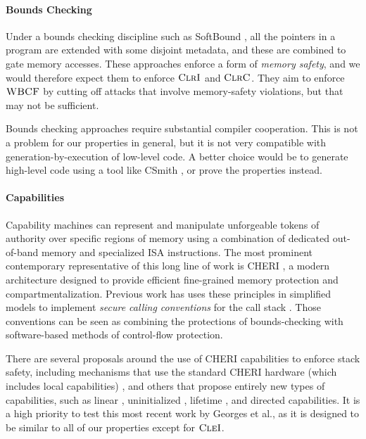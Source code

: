 \documentclass[10pt,conference]{ieeetran}%
\theoremstyle{definition}
\begin{document}
\paragraph{Bounds Checking}
%
Under a bounds checking discipline such as SoftBound \cite{NagarakatteZMZ09}, all the pointers
in a program are extended with some disjoint metadata, and these are combined
to gate memory accesses. These approaches enforce a form of \emph{memory safety},
and we would therefore expect them to enforce \(\textnormal{\sc ClrI}\) and \(\textnormal{\sc ClrC}\). They aim
to enforce \(\textnormal{\sc WBCF}\) by cutting off attacks that involve memory-safety violations,
but that may not be sufficient.

Bounds checking approaches require substantial compiler cooperation. This is not a
problem for our properties in general, but it is not very compatible with
generation-by-execution of low-level code. A better choice would be to generate
high-level code using a tool like CSmith \cite{DBLP:conf/pldi/YangCER11}, or prove the properties instead.

\paragraph{Capabilities}

Capability machines can represent and manipulate
unforgeable tokens of authority over specific regions of
memory using a combination of dedicated out-of-band memory and
specialized ISA instructions.
%
The most prominent contemporary representative of this long line of work is
CHERI \cite{DBLP:conf/sp/WatsonWNMACDDGL15}, a modern architecture designed to provide efficient fine-grained
memory protection and compartmentalization.
%
Previous work has uses these principles in simplified models to implement
\emph{secure calling conventions} for the call
stack \cite{SkorstengaardLocal,SkorstengaardSTKJFP,Georges22:TempsDesCerises}. Those conventions can be seen as combining the
protections of bounds-checking with software-based methods of control-flow protection.

There are several proposals around the use of CHERI capabilities to enforce stack safety,
including mechanisms that use the standard CHERI hardware (which includes local
capabilities) \cite{SkorstengaardLocal},
and others that propose entirely new types of capabilities, such as linear
\cite{SkorstengaardSTK}, uninitialized \cite{Georges+21}, lifetime
\cite{Tsampas+19}, and directed \cite{Georges22:TempsDesCerises} capabilities.
It is a high priority to test this most recent work by Georges et al., as it is designed
to be similar to all of our properties except for \(\textnormal{\sc CleI}\).
\end{document}
